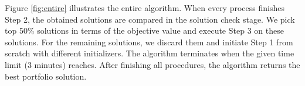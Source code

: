 \documentclass[11pt]{article}
\begin{document}
Figure \ref{fig:entire} illustrates the entire algorithm. When every process finishes Step 2, the obtained solutions are compared in the solution check stage. We pick top 50\% solutions in terms of the objective value and execute Step 3 on these solutions. For the remaining solutions, we discard them and initiate Step 1 from scratch with different initializers. The algorithm terminates when the given time limit (3 minutes) reaches. After finishing all procedures, the algorithm returns the best portfolio solution. 


\end{document}
